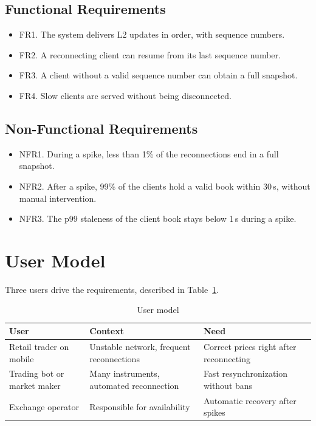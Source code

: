 \documentclass[conference]{IEEEtran}
\begin{document}
\subsection{Functional Requirements}

\begin{itemize}
\item FR1. The system delivers L2 updates in order, with sequence numbers.
\item FR2. A reconnecting client can resume from its last sequence number.
\item FR3. A client without a valid sequence number can obtain a full snapshot.
\item FR4. Slow clients are served without being disconnected.
\end{itemize}

\subsection{Non-Functional Requirements}

\begin{itemize}
\item NFR1. During a spike, less than 1\% of the reconnections end in a full snapshot.
\item NFR2. After a spike, 99\% of the clients hold a valid book within 30\,s, without manual intervention.
\item NFR3. The p99 staleness of the client book stays below 1\,s during a spike.
\end{itemize}

\section{User Model}

Three users drive the requirements, described in Table~\ref{tab:users}.

\begin{table}[t]
\caption{User model}
\label{tab:users}
\centering
\footnotesize
\begin{tabular}{p{1.8cm}p{2.7cm}p{2.7cm}}
\toprule
User & Context & Need \\
\midrule
Retail trader on mobile & Unstable network, frequent reconnections & Correct prices right after reconnecting \\
Trading bot or market maker & Many instruments, automated reconnection & Fast resynchronization without bans \\
Exchange operator & Responsible for availability & Automatic recovery after spikes \\
\bottomrule
\end{tabular}
\end{table}
\end{document}
